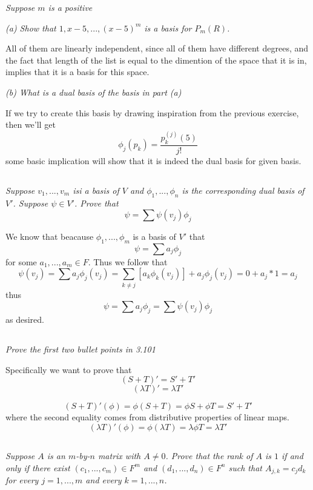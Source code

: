 \documentclass[11pt,oneside,titlepage]{book}
\begin{document}
\textit{Suppose $m$ is a positive }

\textit{(a) Show that $1, x - 5, ..., (x - 5)^m$ is a basis for $P_m(R)$.}

All of them are linearly independent, since all of them  have different degrees, and the fact
that length of the list is equal to the dimention of the space that it is in, implies that
it is a basis for this space.

\textit{(b) What is a dual basis of the basis in part (a)}

If we try to create this basis by drawing inspiration from the previous exercise, then we'll
get
$$\phi_j(p_k) = \frac{p_k^{(j)}(5)}{j!}$$
some basic implication will show that it is indeed the dual basis for given basis.

\subsection{}

\textit{Suppose $v_1, ..., v_m$ isi a basis of $V$ and $\phi_1, ..., \phi_n$ is the
  corresponding dual basis of $V'$. Suppose $\psi \in V'$. Prove that}
$$\psi = \sum \psi(v_j) \phi_j$$

We know that beacause $\phi_1, ..., \phi_m$ is a basis of $V'$ that
$$\psi = \sum a_j\phi_j $$
for some $a_1, ..., a_m \in F$. Thus we follow that
$$\psi(v_j) =  \sum a_j \phi_j(v_j) = \sum_{k \neq j} {[a_k \phi_k(v_j)]} + a_j \phi_j(v_j) =
0 +  a_j * 1 =  a_j$$
thus
$$\psi = \sum {a_j \phi_j} = \sum{ \psi(v_j) \phi_j}$$
as desired.

\subsection{}

\textit{Prove the first two bullet points in 3.101}

Specifically we want to prove that
$$(S + T)' = S' + T'$$
$$(\lambda T)' = \lambda T'$$

$$(S + T)'(\phi) = \phi (S + T) = \phi S + \phi T = S' + T'$$
where the second equality comes from distributive properties of linear maps.
$$(\lambda T)'(\phi) = \phi (\lambda T) = \lambda \phi T = \lambda T'$$

\subsection{}

\textit{Suppose $A$ is an $m$-by-$n$ matrix with $A \neq 0$. Prove that the rank of $A$ is
  $1$ if and only if there exist $(c_1, ..., c_m) \in F^m$ and $(d_1, ..., d_n) \in F^n$
  such that $A_{j, k} = c_j d_k$ for every $j = 1, ..., m$ and every $k = 1, ..., n$.}
\end{document}
